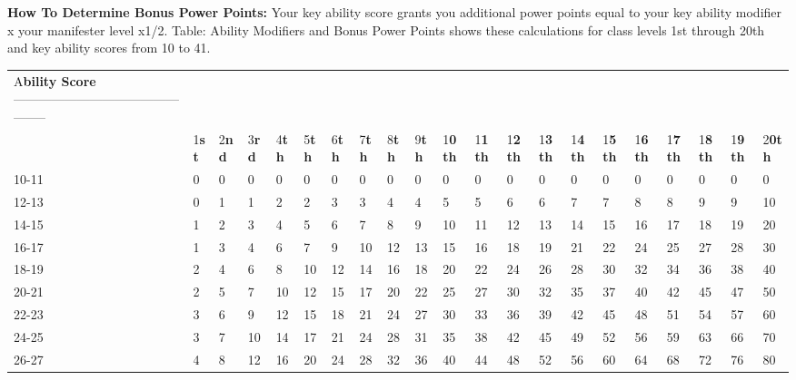 \documentclass{article}
\begin{document}
\textbf{How To Determine Bonus Power Points:} Your key ability score grants you 
additional power points equal to your key ability modifier x your manifester level 
x1/2. Table: Ability Modifiers and Bonus Power Points shows these calculations 
for class levels 1st through 20th and key ability scores from 10 to 41.

\vspace{12pt}
\begin{tabular}{|>{\raggedright}p{11pt}|>{\raggedright}p{3pt}|>{\raggedright}p{4pt}|>{\raggedright}p{3pt}|>{\raggedright}p{3pt}|>{\raggedright}p{3pt}|>{\raggedright}p{3pt}|>{\raggedright}p{3pt}|>{\raggedright}p{3pt}|>{\raggedright}p{3pt}|>{\raggedright}p{4pt}|>{\raggedright}p{4pt}|>{\raggedright}p{4pt}|>{\raggedright}p{4pt}|>{\raggedright}p{4pt}|>{\raggedright}p{4pt}|>{\raggedright}p{4pt}|>{\raggedright}p{4pt}|>{\raggedright}p{4pt}|>{\raggedright}p{4pt}|>{\raggedright}p{4pt}|}
\hline
\multicolumn{21}{|p{98pt}|}{T\textbf{able: Ability Modifiers and Bonus Power Points}}\tabularnewline
\hline
A\textbf{bility Score}----------------------------------------------- & \multicolumn{20}{p{86pt}|}{ 
\textbf{Bonus Power Points (by Class Level) -------------------------------------------}}\tabularnewline
\hline
 & 1\textbf{st} & 2\textbf{nd} & 3\textbf{rd} & 4\textbf{th} & 5\textbf{th} & 6\textbf{th} & 7\textbf{th} & 8\textbf{th} & 9\textbf{th} & 1\textbf{0th} & 1\textbf{1th} & 1\textbf{2th} & 1\textbf{3th} & 1\textbf{4th} & 1\textbf{5th} & 1\textbf{6th} & 1\textbf{7th} & 1\textbf{8th} & 1\textbf{9th} & 2\textbf{0th}\tabularnewline
\hline
10-11 & 0 & 0 & 0 & 0 & 0 & 0 & 0 & 0 & 0 & 0 & 0 & 0 & 0 & 0 & 0 & 0 & 0 & 0 & 0 & 0\tabularnewline
\hline
12-13 & 0 & 1 & 1 & 2 & 2 & 3 & 3 & 4 & 4 & 5 & 5 & 6 & 6 & 7 & 7 & 8 & 8 & 9 & 9 & 10\tabularnewline
\hline
14-15 & 1 & 2 & 3 & 4 & 5 & 6 & 7 & 8 & 9 & 10 & 11 & 12 & 13 & 14 & 15 & 16 & 17 & 18 & 19 & 20\tabularnewline
\hline
16-17 & 1 & 3 & 4 & 6 & 7 & 9 & 10 & 12 & 13 & 15 & 16 & 18 & 19 & 21 & 22 & 24 & 25 & 27 & 28 & 30\tabularnewline
\hline
18-19 & 2 & 4 & 6 & 8 & 10 & 12 & 14 & 16 & 18 & 20 & 22 & 24 & 26 & 28 & 30 & 32 & 34 & 36 & 38 & 40\tabularnewline
\hline
20-21 & 2 & 5 & 7 & 10 & 12 & 15 & 17 & 20 & 22 & 25 & 27 & 30 & 32 & 35 & 37 & 40 & 42 & 45 & 47 & 50\tabularnewline
\hline
22-23 & 3 & 6 & 9 & 12 & 15 & 18 & 21 & 24 & 27 & 30 & 33 & 36 & 39 & 42 & 45 & 48 & 51 & 54 & 57 & 60\tabularnewline
\hline
24-25 & 3 & 7 & 10 & 14 & 17 & 21 & 24 & 28 & 31 & 35 & 38 & 42 & 45 & 49 & 52 & 56 & 59 & 63 & 66 & 70\tabularnewline
\hline
26-27 & 4 & 8 & 12 & 16 & 20 & 24 & 28 & 32 & 36 & 40 & 44 & 48 & 52 & 56 & 60 & 64 & 68 & 72 & 76 & 80\tabularnewline

\end{tabular}
\end{document}
